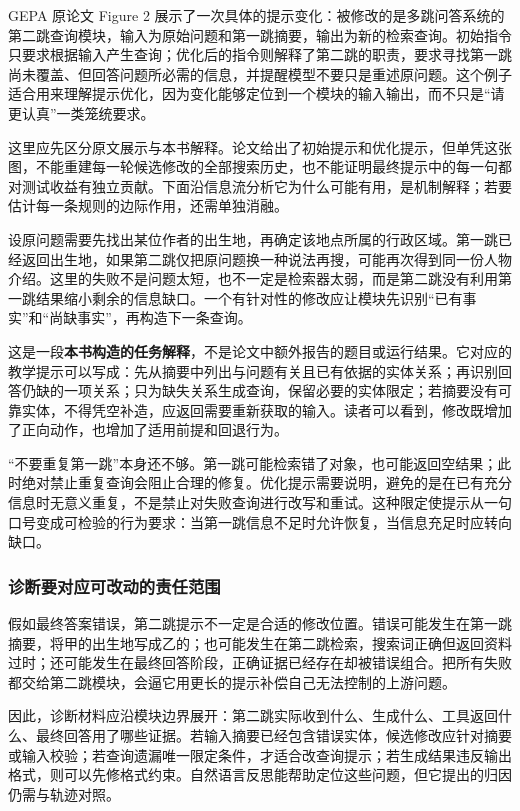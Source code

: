 GEPA 原论文 Figure 2 展示了一次具体的提示变化：被修改的是多跳问答系统的第二跳查询模块，输入为原始问题和第一跳摘要，输出为新的检索查询\cite{gepa-2507}。初始指令只要求根据输入产生查询；优化后的指令则解释了第二跳的职责，要求寻找第一跳尚未覆盖、但回答问题所必需的信息，并提醒模型不要只是重述原问题。这个例子适合用来理解提示优化，因为变化能够定位到一个模块的输入输出，而不只是“请更认真”一类笼统要求。

这里应先区分原文展示与本书解释。论文给出了初始提示和优化提示，但单凭这张图，不能重建每一轮候选修改的全部搜索历史，也不能证明最终提示中的每一句都对测试收益有独立贡献。下面沿信息流分析它为什么可能有用，是机制解释；若要估计每一条规则的边际作用，还需单独消融。

设原问题需要先找出某位作者的出生地，再确定该地点所属的行政区域。第一跳已经返回出生地，如果第二跳仅把原问题换一种说法再搜，可能再次得到同一份人物介绍。这里的失败不是问题太短，也不一定是检索器太弱，而是第二跳没有利用第一跳结果缩小剩余的信息缺口。一个有针对性的修改应让模块先识别“已有事实”和“尚缺事实”，再构造下一条查询。

这是一段\textbf{本书构造的任务解释}，不是论文中额外报告的题目或运行结果。它对应的教学提示可以写成：先从摘要中列出与问题有关且已有依据的实体关系；再识别回答仍缺的一项关系；只为缺失关系生成查询，保留必要的实体限定；若摘要没有可靠实体，不得凭空补造，应返回需要重新获取的输入。读者可以看到，修改既增加了正向动作，也增加了适用前提和回退行为。

“不要重复第一跳”本身还不够。第一跳可能检索错了对象，也可能返回空结果；此时绝对禁止重复查询会阻止合理的修复。优化提示需要说明，避免的是在已有充分信息时无意义重复，不是禁止对失败查询进行改写和重试。这种限定使提示从一句口号变成可检验的行为要求：当第一跳信息不足时允许恢复，当信息充足时应转向缺口。

\subsubsection{诊断要对应可改动的责任范围}

假如最终答案错误，第二跳提示不一定是合适的修改位置。错误可能发生在第一跳摘要，将甲的出生地写成乙的；也可能发生在第二跳检索，搜索词正确但返回资料过时；还可能发生在最终回答阶段，正确证据已经存在却被错误组合。把所有失败都交给第二跳模块，会逼它用更长的提示补偿自己无法控制的上游问题。

因此，诊断材料应沿模块边界展开：第二跳实际收到什么、生成什么、工具返回什么、最终回答用了哪些证据。若输入摘要已经包含错误实体，候选修改应针对摘要或输入校验；若查询遗漏唯一限定条件，才适合改查询提示；若生成结果违反输出格式，则可以先修格式约束。自然语言反思能帮助定位这些问题，但它提出的归因仍需与轨迹对照。


